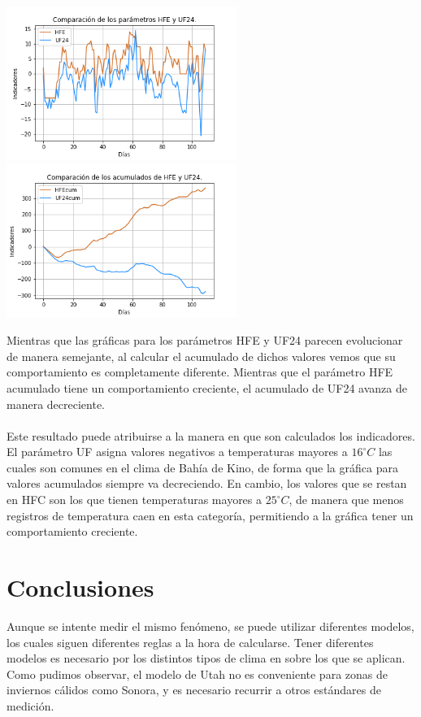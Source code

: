 \documentclass[letterpaper,12pt]{article}
\begin{document}
\begin{center}
	\includegraphics[height=5cm]{HFE_U24.png}\hspace*{\fill}
	\label{graf1}
   \includegraphics[height=5cm]{HFE_U24_cum.png}
    \label{graf2}
\end{center}


Mientras que las gráficas para los parámetros HFE y UF24 parecen evolucionar de manera semejante, al calcular el acumulado de dichos valores vemos que su comportamiento es completamente diferente. Mientras que el parámetro HFE acumulado tiene un comportamiento creciente, el acumulado de UF24 avanza de manera decreciente. 
\\
\\
Este resultado puede atribuirse a la manera en que son calculados los indicadores. El parámetro UF asigna valores negativos a temperaturas mayores a $16^\circ C$ las cuales son comunes en el clima de Bahía de Kino, de forma que la gráfica para valores acumulados siempre va decreciendo. En cambio, los valores que se restan en HFC son los que tienen temperaturas mayores a $25^\circ C$, de manera que menos registros de temperatura caen en esta categoría, permitiendo a la gráfica tener un comportamiento creciente.

\section{Conclusiones}
Aunque se intente medir el mismo fenómeno, se puede utilizar diferentes modelos, los cuales siguen diferentes reglas a la hora de calcularse. Tener diferentes modelos es necesario por los distintos tipos de clima en sobre los que se aplican. Como pudimos observar, el modelo de Utah no es conveniente para zonas de inviernos cálidos como Sonora, y es necesario recurrir a otros estándares de medición.
\end{document}
